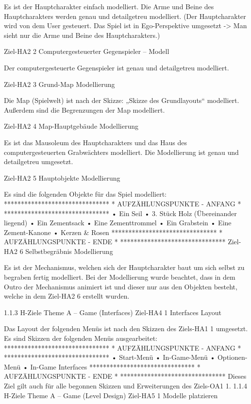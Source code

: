 Es ist der Hauptcharakter einfach modelliert. Die Arme und Beine des Hauptcharakters werden genau und detailgetreu modelliert. (Der Hauptcharakter wird von dem User gesteuert. Das Spiel ist in Ego-Perspektive umgesetzt -> Man sieht nur die Arme und Beine des Hauptcharakters.)

	Ziel-HA2 2 	Computergesteuerter Gegenspieler – Modell

Der computergesteuerte Gegenspieler ist genau und detailgetreu modelliert.

	Ziel-HA2 3	Grund-Map Modellierung

Die Map (Spielwelt) ist nach der Skizze: „Skizze des Grundlayouts“ modelliert. Außerdem sind die Begrenzungen der Map modelliert.

	Ziel-HA2 4	Map-Hauptgebäude Modellierung

Es ist das Mausoleum des Hauptcharakters und das Haus des computergesteuerten Grabwächters modelliert. Die Modellierung ist genau und detailgetreu umgesetzt.

	Ziel-HA2 5	Hauptobjekte Modellierung

			Es sind die folgenden Objekte für das Spiel modelliert:
		 *******************************
		 *  AUFZÄHLUNGSPUNKTE - ANFANG *
		 *******************************
•	Ein Seil
•	3. Stück Holz (Übereinander liegend)
•	Ein Zementsack
•	Eine Zementtrommel
•	Ein Grabstein
•	Eine Zement-Kanone
•	Kerzen & Rosen
		 *******************************
		 *  AUFZÄHLUNGSPUNKTE - ENDE   *
		 *******************************
	Ziel-HA2 6	Selbstbegräbnis Modellierung

Es ist der Mechanismus, welchen sich der Hauptcharakter baut um sich selbst zu begraben fertig modelliert. Bei der Modellierung wurde beachtet, dass in dem Outro der Mechanismus animiert ist und dieser nur aus den Objekten besteht, welche in dem Ziel-HA2 6 erstellt wurden.



1.1.3	H-Ziele Theme A – Game (Interfaces)
Ziel-HA4 1	Interfaces Layout

Das Layout der folgenden Menüs ist nach den Skizzen des Ziels-HA1 1 umgesetzt. Es sind Skizzen der folgenden Menüs ausgearbeitet:
		 *******************************
		 *  AUFZÄHLUNGSPUNKTE - ANFANG *
		 *******************************
•	Start-Menü
•	In-Game-Menü
•	Optionen-Menü
•	In-Game Interfaces
		 *******************************
		 *  AUFZÄHLUNGSPUNKTE - ENDE   *
		 *******************************
Dieses Ziel gilt auch für alle begonnen Skizzen und Erweiterungen des Ziels-OA1 1.
1.1.4	H-Ziele Theme A – Game (Level Design)
Ziel-HA5 1 	Modelle platzieren

